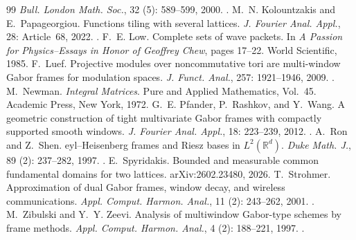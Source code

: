 \documentclass[11pt,reqno]{amsart}
\numberwithin{equation}{section}
\theoremstyle{definition}
\theoremstyle{remark}
\begin{document}
\begin{thebibliography}{99}
\newblock \emph{Bull. London Math. Soc.}, 32 (5): 589--599,
  2000.
\newblock {}.
M.~N. Kolountzakis and E.~Papageorgiou.
\newblock Functions tiling with several lattices.
\newblock \emph{J. Fourier Anal. Appl.}, 28: Article~68, 2022.
\newblock {}.
F.~E. Low.
\newblock Complete sets of wave packets.
\newblock In \emph{A Passion for Physics--Essays in Honor of Geoffrey Chew},
  pages 17--22. World Scientific, 1985.
F.~Luef.
\newblock Projective modules over noncommutative tori are multi-window {G}abor
  frames for modulation spaces.
\newblock \emph{J. Funct. Anal.}, 257: 1921--1946, 2009.
\newblock {}.
M.~Newman.
\newblock \emph{Integral Matrices}.
\newblock Pure and Applied Mathematics, Vol.~45. Academic Press, New York,
  1972.
G.~E. Pfander, P.~Rashkov, and Y.~Wang.
\newblock A geometric construction of tight multivariate {G}abor frames with
  compactly supported smooth windows.
\newblock \emph{J. Fourier Anal. Appl.}, 18: 223--239, 2012.
\newblock {}.
A.~Ron and Z.~Shen.
eyl--{H}eisenberg frames and {R}iesz bases in $L^2(\mathbb R^d)$.
\newblock \emph{Duke Math. J.}, 89 (2): 237--282, 1997.
\newblock {}.
E.~Spyridakis.
\newblock Bounded and measurable common fundamental domains for two lattices.
\newblock arXiv:2602.23480, 2026.
T.~Strohmer.
\newblock Approximation of dual {G}abor frames, window decay, and wireless communications.
\newblock \emph{Appl. Comput. Harmon. Anal.}, 11 (2): 243--262, 2001.
\newblock {}.
M.~Zibulski and Y.~Y. Zeevi.
\newblock Analysis of multiwindow {G}abor-type schemes by frame methods.
\newblock \emph{Appl. Comput. Harmon. Anal.}, 4 (2):
  188--221, 1997.
\newblock {}.

\end{thebibliography}
 
\end{document}

